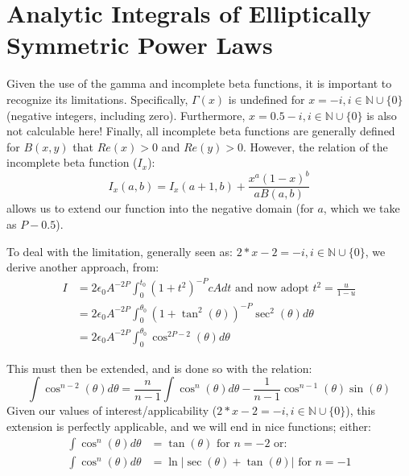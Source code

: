 \documentclass[twocolumn,traditabstract]{aa}
\begin{document}

\appendix

\section{Analytic Integrals of Elliptically Symmetric Power Laws}
\label{sec:analytic_integrals}

Given the use of the gamma and incomplete beta functions, it is important to recognize its limitations.
Specifically, $\Gamma(x)$ is undefined for $x = -i, i \in \mathbb{N} \cup \{0\}$ (negative integers, including
zero). Furthermore, $x = 0.5-i, i \in \mathbb{N} \cup \{0\}$ is also not calculable here! Finally, all incomplete
beta functions are generally defined for $B(x,y)$ that $Re(x) > 0$ and $Re(y) > 0$. However, the relation of the
incomplete beta function ($I_x$):
\begin{equation}
  I_x(a,b) = I_x(a+1,b) + \frac{x^a (1-x)^b}{a B(a,b)}
  \label{eqn:recibeta}
\end{equation}
allows us to extend our function into the negative domain (for $a$, which we take as $P-0.5$). 

To deal with the limitation, generally seen as: $2*x-2 = -i, i \in \mathbb{N} \cup \{0\}$, we derive another approach, from:
\begin{align}
  I &= 2 \epsilon_0 A^{-2P} \int_{0}^{t_0}(1+t^2)^{-P} c A dt \text{ and now adopt } t^2 = \frac{u}{1-u} \\
    &= 2 \epsilon_0 A^{-2P} \int_{0}^{\theta_0}(1+\tan^2(\theta))^{-P} \sec^2(\theta) d\theta \\
    &= 2 \epsilon_0 A^{-2P} \int_{0}^{\theta_0}\cos^{2P-2}(\theta) d\theta
\end{align}

This must then be extended, and is done so with the relation:
\begin{equation}
  \int \cos^{n-2}(\theta) d\theta = \frac{n}{n-1}\int \cos^n(\theta)d\theta - \frac{1}{n-1}\cos^{n-1}(\theta)\sin(\theta) 
  \label{eqn:cosext}
\end{equation}
Given our values of interest/applicability ($2*x-2 = -i, i \in \mathbb{N} \cup \{0\}$), this extension is perfectly
applicable, and we will end in nice functions; either:
\begin{align*}
  \int \cos^n(\theta)d\theta &= \tan(\theta) \text{ for } n=-2 \text{ or: } \\
  \int \cos^n(\theta)d\theta &= \ln \vert \sec(\theta) + \tan(\theta) \vert \text{ for } n=-1
\end{align*}
\end{document}
